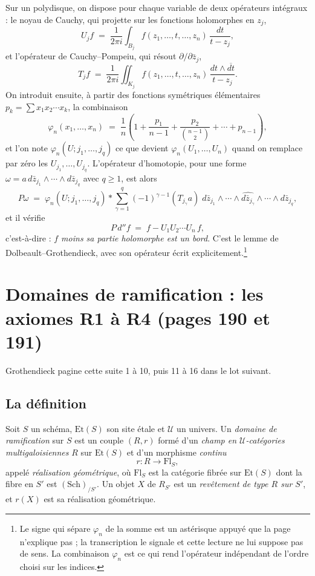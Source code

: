 \documentclass[11pt,a4paper]{article}
\begin{document}
Sur un polydisque, on dispose pour chaque variable de deux opérateurs
intégraux : le noyau de Cauchy, qui projette sur les fonctions holomorphes en
$z_{j}$,
\[
  U_{j} f \;=\; \frac{1}{2\pi i} \int_{B_{j}}
    f(z_{1}, \ldots, t, \ldots, z_{n})\, \frac{dt}{t - z_{j}} ,
\]
et l'opérateur de Cauchy--Pompeiu, qui résout $\partial/\partial\bar{z}_{j}$,
\[
  T_{j} f \;=\; \frac{1}{2\pi i} \iint_{K_{j}}
    f(z_{1}, \ldots, t, \ldots, z_{n})\,
    \frac{dt \wedge \overline{dt}}{t - z_{j}} .
\]
On introduit ensuite, à partir des fonctions symétriques élémentaires
$p_{k} = \sum x_{1}x_{2}\cdots x_{k}$, la combinaison
\[
  \varphi_{n}(x_{1}, \ldots, x_{n}) \;=\; \frac{1}{n}\left(1 +
  \frac{p_{1}}{n-1} + \frac{p_{2}}{\binom{n-1}{2}} + \cdots + p_{n-1}\right) ,
\]
et l'on note $\varphi_{n}(U ; j_{1}, \ldots, j_{q})$ ce que devient
$\varphi_{n}(U_{1}, \ldots, U_{n})$ quand on remplace par zéro les
$U_{j_{1}}, \ldots, U_{j_{q}}$. L'opérateur d'homotopie, pour une forme
$\omega = a\, d\bar{z}_{j_{1}} \wedge \cdots \wedge d\bar{z}_{j_{q}}$ avec
$q \geqslant 1$, est alors
\[
  P\omega \;=\; \varphi_{n}(U ; j_{1}, \ldots, j_{q}) \ast
  \sum_{\gamma=1}^{q} (-1)^{\gamma-1} (T_{j_{\gamma}} a)\;
  d\bar{z}_{j_{1}} \wedge \cdots \wedge
  \widehat{d\bar{z}_{j_{\gamma}}} \wedge \cdots \wedge d\bar{z}_{j_{q}} ,
\]
et il vérifie
\[
  P\, d'' f \;=\; f - U_{1}U_{2}\cdots U_{n}\, f ,
\]
c'est-à-dire : \emph{$f$ moins sa partie holomorphe est un bord}. C'est le
lemme de Dolbeault--Grothendieck, avec son opérateur écrit
explicitement.\footnote{Le signe qui sépare $\varphi_{n}$ de la somme est un
astérisque appuyé que la page n'explique pas ; la transcription le signale et
cette lecture ne lui suppose pas de sens. La combinaison $\varphi_{n}$ est ce
qui rend l'opérateur indépendant de l'ordre choisi sur les indices.}

\section*{Domaines de ramification : les axiomes R1 à R4 (pages 190 et 191)}

Grothendieck pagine cette suite 1 à 10, puis 11 à 16 dans le lot suivant.

\subsection*{La définition}

Soit $S$ un schéma, $\mathrm{Et}(S)$ son site étale et $\mathcal{U}$ un
univers. Un \emph{domaine de ramification} sur $S$ est un couple $(R, r)$ formé
d'un \emph{champ en $\mathcal{U}$-catégories multigaloisiennes} $R$ sur
$\mathrm{Et}(S)$ et d'un morphisme \emph{continu}
\[
  r : R \longrightarrow \mathrm{Fl}_{S} ,
\]
appelé \emph{réalisation géométrique}, où $\mathrm{Fl}_{S}$ est la catégorie
fibrée sur $\mathrm{Et}(S)$ dont la fibre en $S'$ est $(\mathrm{Sch})_{/S'}$.
Un objet $X$ de $R_{S'}$ est un \emph{revêtement de type $R$ sur $S'$}, et
$r(X)$ est sa réalisation géométrique.
\end{document}
